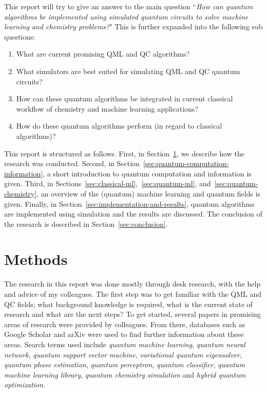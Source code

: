 \documentclass[a4paper,10pt]{article}
\begin{document}
This report will try to give an answer to the main question ``\emph{How can quantum algorithms be implemented using simulated quantum circuits to solve machine learning and chemistry problems?}"
This is further expanded into the following sub questions:
\begin{enumerate}
	\item What are current promising QML and QC algorithms?
	\item What simulators are best suited for simulating QML and QC quantum circuits?
	\item How can these quantum algorithms be integrated in current classical workflow of chemistry and machine learning applications?
	\item How do these quantum algorithms perform (in regard to classical algorithms)?
\end{enumerate}

This report is structured as follows. First, in Section~\ref{sec:methods}, we describe how the research was conducted.
Second, in Section~\ref{sec:quantum-computation-information}, a short introduction to quantum computation and information is given.
Third, in Sections~\ref{sec:classical-ml},~\ref{sec:quantum-ml}, and~\ref{sec:quantum-chemistry}, an overview of the (quantum) machine learning and quantum fields is given.
Finally, in Section~\ref{sec:implementation-and-results}, quantum algorithms are implemented using simulation and the results are discussed.
The conclusion of the research is described in Section~\ref{sec:conclusion}.

\section{Methods} \label{sec:methods}
The research in this report was done mostly through desk research, with the help and advice of my colleagues.
The first step was to get familiar with the QML and QC fields; what background knowledge is required, what is the current state of research and what are the next steps?
To get started, several papers in promising areas of research were provided by colleagues. 
From there, databases such as Google Scholar and arXiv were used to find further information about these areas.
Search terms used include \emph{quantum machine learning}, \emph{quantum neural network}, \emph{quantum support vector machine}, \emph{variational quantum eigensolver}, \emph{quantum phase estimation}, \emph{quantum perceptron}, \emph{quantum classifier}, \emph{quantum machine learning library}, \emph{quantum chemistry simulation} and \emph{hybrid quantum optimization}.
\end{document}
